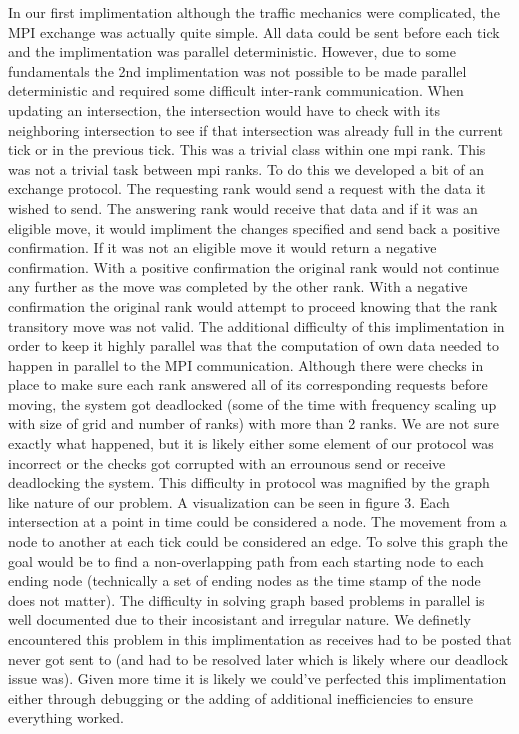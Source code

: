 \documentclass[10pt,a4paper]{article}
\begin{document}
In our first implimentation although the traffic mechanics were complicated, the MPI exchange was actually quite simple. All data could be sent before each tick and the implimentation was parallel deterministic. However, due to some fundamentals the 2nd implimentation was not possible to be made parallel deterministic and required some difficult inter-rank communication. When updating an intersection, the intersection would have to check with its neighboring intersection to see if that intersection was already full in the current tick or in the previous tick. This was a trivial class within one mpi rank. This was not a trivial task between mpi ranks. To do this we developed a bit of an exchange protocol. The requesting rank would send a request with the data it wished to send. The answering rank would receive that data and if it was an eligible move, it would impliment the changes specified and send back a positive confirmation. If it was not an eligible move it would return a negative confirmation. With a positive confirmation the original rank would not continue any further as the move was completed by the other rank. With a negative confirmation the original rank would attempt to proceed knowing that the rank transitory move was not valid.
The additional difficulty of this implimentation in order to keep it highly parallel was that the computation of own data needed to happen in parallel to the MPI communication. Although there
were checks in place to make sure each rank answered all of its corresponding requests before moving,
the system got deadlocked (some of the time with frequency scaling up with size of grid and number of ranks) with more than 2 ranks. We are not sure exactly what happened, but it is likely either some element of our protocol was incorrect or the checks got corrupted with an errounous send or receive
deadlocking the system.
This difficulty in protocol was magnified by the graph like nature of our problem. A visualization can be seen in figure 3. Each intersection at a point in time could be considered a node. The movement from a node to another at each tick could be considered an edge. To solve this graph the goal would be to find a non-overlapping path from each starting node to each ending node (technically a set of ending nodes as the time stamp of the node does not matter). The difficulty in solving graph based problems in parallel is well documented due to their incosistant and irregular nature. We definetly encountered this problem in this implimentation as receives had to be posted that never got sent to (and had to be resolved later which is likely where our deadlock issue was).
Given more time it is likely we could've perfected this implimentation either through debugging or the adding of additional inefficiencies to ensure everything worked. 
\end{document}
